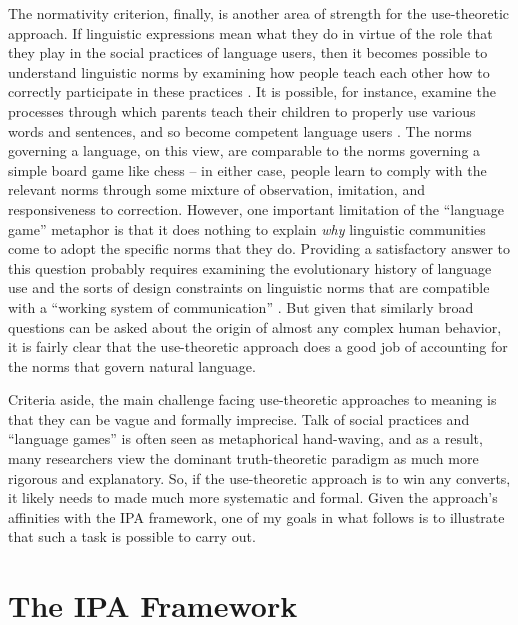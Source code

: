 The normativity criterion, finally, is another area of strength for the use-theoretic approach. If linguistic expressions mean what they do in virtue of the role that they play in the social practices of language users, then it becomes possible to understand linguistic norms by examining how people teach each other how to correctly participate in these practices \citep{Brandom:1994,Wittgenstein:1953,Kripke:1982}. It is possible, for instance, examine the processes through which parents teach their children to properly use various words and sentences, and so become competent language users \citep{Brandom:2010,Sellars:1954}. The norms governing a language, on this view, are comparable to the norms governing a simple board game like chess -- in either case, people learn to comply with the relevant norms through some mixture of observation, imitation, and responsiveness to correction. However, one important limitation of the ``language game'' metaphor is that it does nothing to explain \textit{why} linguistic communities come to adopt the specific norms that they do. Providing a satisfactory answer to this question probably requires examining the evolutionary history of language use and the sorts of design constraints on linguistic norms that are compatible with a ``working system of communication'' \citep[][p. 54]{Dennett:2010}. But given that similarly broad questions can be asked about the origin of almost any complex human behavior, it is fairly clear that the use-theoretic approach does a good job of accounting for the norms that govern natural language.

Criteria aside, the main challenge facing use-theoretic approaches to meaning is that they can be vague and formally imprecise. Talk of social practices and ``language games'' is often seen as metaphorical hand-waving, and as a result, many researchers view the dominant truth-theoretic paradigm as much more rigorous and explanatory. So, if the use-theoretic approach is to win any converts, it likely needs to made much more systematic and formal. Given the approach's affinities with the IPA framework, one of my goals in what follows is to illustrate that such a task is possible to carry out. 

\section{The IPA Framework}

